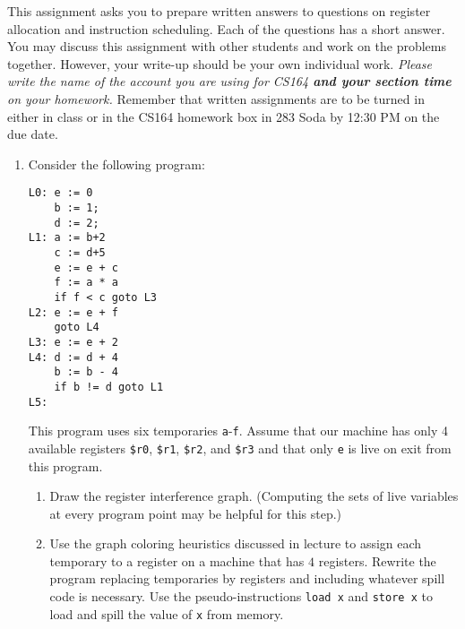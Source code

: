 \documentclass{article}
\begin{document}

This assignment asks you to prepare written answers to questions on
register allocation and instruction scheduling.  Each of the questions has a short
answer.  You may discuss this assignment with other students and work
on the problems together.  However, your write-up should be your own
individual work.  {\em Please write the name of the account you are
using for CS164 {\bf and your section time} on your homework.}
Remember that written assignments are to be turned in either in class
or in the CS164 homework box in 283 Soda by 12:30 PM on the due date.


\begin{enumerate}
\item Consider the following program:

\begin{verbatim}
L0: e := 0
    b := 1;
    d := 2;
L1: a := b+2
    c := d+5
    e := e + c
    f := a * a
    if f < c goto L3
L2: e := e + f
    goto L4
L3: e := e + 2
L4: d := d + 4
    b := b - 4
    if b != d goto L1
L5:
\end{verbatim}

This program uses six temporaries \texttt{a}-\texttt{f}.  Assume that
our machine has only 4 available registers \texttt{\$r0},
\texttt{\$r1}, \texttt{\$r2}, and \texttt{\$r3} 
and that only
\texttt{e} is live on exit from this program.

\begin{enumerate}
\item Draw the register interference graph.  (Computing the sets of
live variables at every program point may be helpful for this step.)

\item Use the graph coloring heuristics discussed in lecture to assign
  each temporary to a register on a machine that has $4$ registers. 
Rewrite the program replacing temporaries by registers and including whatever
spill code is necessary.  Use the pseudo-instructions \texttt{load x}
and \texttt{store x} to load and spill the value of \texttt{x} from
memory.
\end{enumerate}


\end{enumerate}
\end{document}
